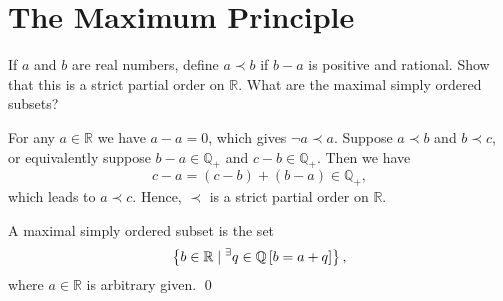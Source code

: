 \documentclass[a4paper,12pt]{article}
\begin{document}
\section{The Maximum Principle}
\setcounter{exe}{0}
\begin{exe}
	If \( a \) and \( b \) are real numbers, define \( a \prec b \) if \( b-a \) is positive and rational.
	Show that this is a strict partial order on \( \mathbb{R} \).
	What are the maximal simply ordered subsets?
\end{exe}
\begin{sol}
	For any \( a \in \mathbb{R} \) we have \( a - a = 0 \),
	which gives \( \neg a \prec a \).
	Suppose \( a \prec b \) and \( b \prec c \), or equivalently
	suppose
	\( b -a \in \mathbb{Q}_{+} \)
	and
	\( c-b\in \mathbb{Q}_{+} \).
	Then we have
	\begin{equation*}
		c-a = (c-b) + (b-a) \in \mathbb{Q}_{+},
	\end{equation*}
	which leads to \( a \prec c \).
	Hence, \( \prec \) is a strict partial order on \( \mathbb{R} \).
	
	A maximal simply ordered subset is the set
	\begin{equation*}
		\left\{ b\in \mathbb{R} \;|\; 
		{}^{\exists} q \in \mathbb{Q}
		\left[ b= a+q \right]
		\right\},
	\end{equation*}
	where \( a \in \mathbb{R} \) is arbitrary given.
	\qed\end{sol}
\end{document}
